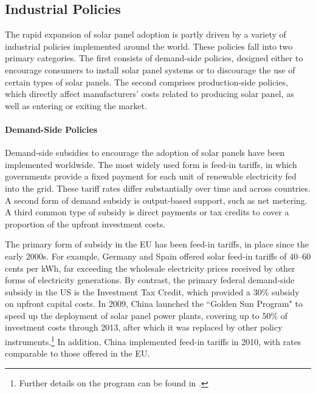 \documentclass[12pt, letter]{article}
\begin{document}

\subsection{Industrial Policies}
\label{subsec:ind_policy}
The rapid expansion of solar panel adoption is partly driven by a variety of industrial policies implemented around the world.  These policies fall into two primary categories.  The first consists of demand-side policies, designed either to encourage consumers to install solar panel systems or to discourage the use of certain types of solar panels. The second comprises production-side policies, which directly affect manufacturers' costs related to producing solar panel, as well as entering or exiting the market.

\paragraph{Demand-Side Policies}
Demand-side subsidies to encourage the adoption of solar panels have been implemented worldwide. The most widely used form is feed-in tariffs, in which governments provide a fixed payment for each unit of renewable electricity fed into the grid. These tariff rates differ substantially over time and across countries. A second form of demand subsidy is output-based support, such as net metering. A third common type of subsidy is direct payments or tax credits to cover a proportion of the upfront investment costs. 

The primary form of subsidy in the EU has been feed-in tariffs, in place since the early 2000s. For example, Germany and Spain offered solar feed-in tariffs of 40–60 cents per kWh, far exceeding the wholesale electricity prices received by other forms of electricity generations. By contrast, the primary federal demand-side subsidy in the US is the Investment Tax Credit, which provided a 30\% subsidy on upfront capital costs. In 2009, China launched the ``Golden Sun Program" to speed up the deployment of solar panel power plants, covering up to 50\% of investment costs through 2013, after which it was replaced by other policy instruments.\footnote{Further details on the program can be found in \cite{iea_golden_sun_2021}.} In addition, China implemented feed-in tariffs in 2010, with rates comparable to those offered in the EU.
\end{document}
